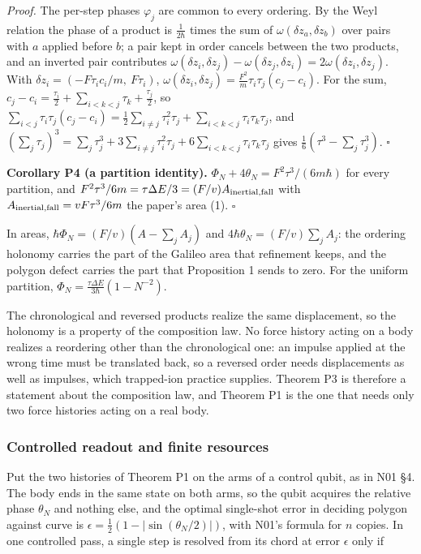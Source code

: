 \documentclass[11pt,a4paper]{article}
\begin{document}
\emph{Proof.} The per-step phases \(\varphi_j\) are common to every
ordering. By the Weyl relation the phase of a product is
\(\frac1{2\hbar}\) times the sum of \(\omega(\delta z_a,\delta z_b)\)
over pairs with \(a\) applied before \(b\); a pair kept in order cancels
between the two products, and an inverted pair contributes
\(\omega(\delta z_i,\delta z_j)-\omega(\delta z_j,\delta z_i)=2\omega(\delta z_i,\delta z_j)\).
With \(\delta z_i=(-F\tau_ic_i/m,\ F\tau_i)\),
\(\omega(\delta z_i,\delta z_j)=\frac{F^2}{m}\tau_i\tau_j(c_j-c_i)\).
For the sum,
\(c_j-c_i=\frac{\tau_i}2+\sum_{i<k<j}\tau_k+\frac{\tau_j}2\), so
\(\sum_{i<j}\tau_i\tau_j(c_j-c_i)=\frac12\sum_{i\ne j}\tau_i^2\tau_j+\sum_{i<k<j}\tau_i\tau_k\tau_j\),
and
\((\sum_j\tau_j)^3=\sum_j\tau_j^3+3\sum_{i\ne j}\tau_i^2\tau_j+6\sum_{i<k<j}\tau_i\tau_k\tau_j\)
gives \(\frac16(\tau^3-\sum_j\tau_j^3)\). \(\square\)

\textbf{Corollary P4 (a partition identity).}
\(\Phi_N+4\theta_N=F^2\tau^3/(6m\hbar)\) for every partition, and
\(F^2\tau^3/6m=\tau\Delta E/3=(F/v)A_{\rm inertial,fall}\) with
\(A_{\rm inertial,fall}=vF\tau^3/6m\) the paper's area (1). \(\square\)

In areas, \(\hbar\Phi_N=(F/v)(A-\sum_jA_j)\) and
\(4\hbar\theta_N=(F/v)\sum_jA_j\): the ordering holonomy carries the
part of the Galileo area that refinement keeps, and the polygon defect
carries the part that Proposition 1 sends to zero. For the uniform
partition, \(\Phi_N=\frac{\tau\Delta E}{3\hbar}(1-N^{-2})\).

The chronological and reversed products realize the same displacement,
so the holonomy is a property of the composition law. No force history
acting on a body realizes a reordering other than the chronological one:
an impulse applied at the wrong time must be translated back, so a
reversed order needs displacements as well as impulses, which
trapped-ion practice supplies. Theorem P3 is therefore a statement about
the composition law, and Theorem P1 is the one that needs only two force
histories acting on a real body.

\hypertarget{controlled-readout-and-finite-resources}{%
\subsubsection{Controlled readout and finite
resources}\label{controlled-readout-and-finite-resources}}

Put the two histories of Theorem P1 on the arms of a control qubit, as
in N01 §4. The body ends in the same state on both arms, so the qubit
acquires the relative phase \(\theta_N\) and nothing else, and the
optimal single-shot error in deciding polygon against curve is
\(\epsilon=\frac12(1-|\sin(\theta_N/2)|)\), with N01's formula for \(n\)
copies. In one controlled pass, a single step is resolved from its chord
at error \(\epsilon\) only if
\end{document}
